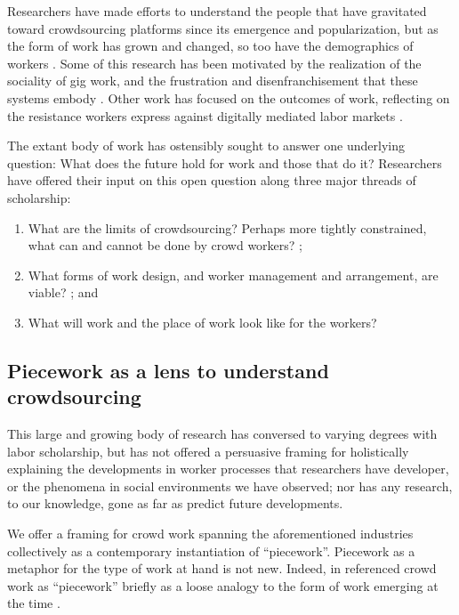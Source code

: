 \documentclass[trackingWork]{subfiles}
\begin{document}
Researchers have made efforts to understand the people
that have gravitated toward crowdsourcing platforms
since its emergence and popularization,
but as the form of work has grown and changed, so too have the demographics of workers
\cite{Ross,whoareNOTtheTurkers}.
Some of this research has been motivated by the realization of the sociality of gig work,
and the frustration and disenfranchisement that these systems embody
\cite{turkopticon,dynamo}.
Other work has focused on the outcomes of work,
reflecting on the resistance workers express against digitally mediated labor markets
\cite{uberAlgorithm}.

The extant body of work has ostensibly sought to answer one underlying question:
What does the future hold for work and those that do it? %
Researchers have offered their input on this open question along three major threads of scholarship:
\begin{enumerate}
  \item What are the limits of crowdsourcing?
  Perhaps more tightly constrained,
  what can and cannot be done by crowd workers?
    \cite{foundry,suzukiAtelier,KimStoria,yuanAlmost,YuEncouragingOutside,embracingErrorKrishna,Nebeling:2016:WCW:2858036.2858169,Hahn:2016:KAB:2858036.2858364};
  \item What forms of work design, and worker management and arrangement, are viable?
    \cite{bernsteinSoylent,sensitiveTasks,LykourentzouPersonalityMatters,KucherbaevReLauncher,Law:2016:CKC:2858036.2858144,Cai:2016:CRI:2858036.2858237,Chang:2016:ACC:2858036.2858411,Newell:2016:OMA:2858036.2858490}; and%
  \item What will work and the place of work look like for the workers?
    \cite{turkopticon,storiesIraniSilberman,dynamo,crowdcollab,whyWouldAnyoneBrewer,takingAHITMcInnis}
\end{enumerate}


\subsection{Piecework as a lens to understand crowdsourcing}
This large and growing body of research has conversed
to varying degrees with labor scholarship,
but has not offered a persuasive framing for holistically explaining
the developments in worker processes that researchers have developer, or
the phenomena in social environments we have observed;
nor has any research, to our knowledge,
gone as far as predict future developments.

We offer a framing for crowd work spanning the aforementioned industries
collectively as a contemporary instantiation of ``piecework''.
Piecework as a metaphor for the type of work at hand is not new.
Indeed,
\citeauthor{crowdworkFuture} in \citeauthor{crowdworkFuture}
referenced crowd work as ``piecework'' briefly
as a loose analogy to the form of work emerging at the time
\cite{crowdworkFuture}.
\end{document}
